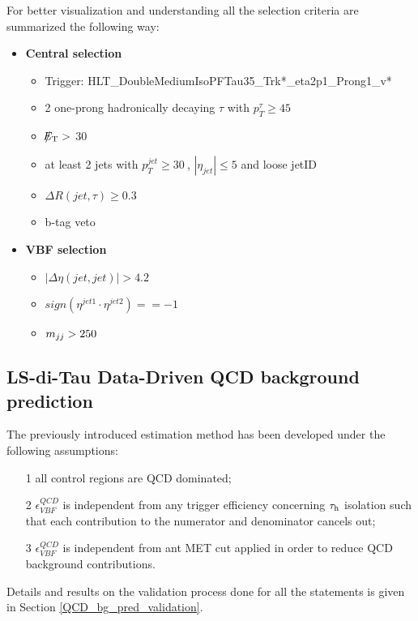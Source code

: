 For better visualization and understanding all the selection criteria are summarized the following way:

\begin{itemize}
	\item \textbf{Central selection}
	\begin{itemize}
		\item Trigger: HLT\_DoubleMediumIsoPFTau35\_Trk*\_eta2p1\_Prong1\_v*
		\item 2 one-prong hadronically decaying $\tau$ with $p_{T}^{\tau}\geq45~$\gev 
		\item $\slash\mkern-12mu{E}_{\text{T}} > $ 30
		\item at least 2 jets with $p_{T}^{jet}\geq30~$\gev, $|\eta_{jet}|\leq5$ and loose jetID
		\item $\Delta R(jet,\tau)\geq0.3$
		\item b-tag veto
	\end{itemize}
	\item \textbf{VBF selection}
	\begin{itemize}
		\item $|\Delta\eta(jet,jet)| > 4.2$
		\item $sign(\eta^{jet 1}\cdot\eta^{jet 2})==-1$
		\item $m_{jj}>250~$\gev
	\end{itemize}
\end{itemize}

\subsection {LS-di-Tau Data-Driven QCD background prediction} \label{sec:bgestimation}

The previously introduced estimation method has been developed under the following assumptions:
\begin{itemize}
	\item[1] all control regions are QCD dominated;
	\item[2] $\epsilon^{QCD}_{VBF}$ is independent from any trigger efficiency concerning $\tau_{\text{h}}$ isolation such that each contribution to the numerator and denominator cancels out;
	\item[3] $\epsilon^{QCD}_{VBF}$ is independent from ant MET cut applied in order to reduce QCD background contributions. 
\end{itemize}

Details and results on the validation process done for all the statements is given in Section \ref{QCD_bg_pred_validation}.

